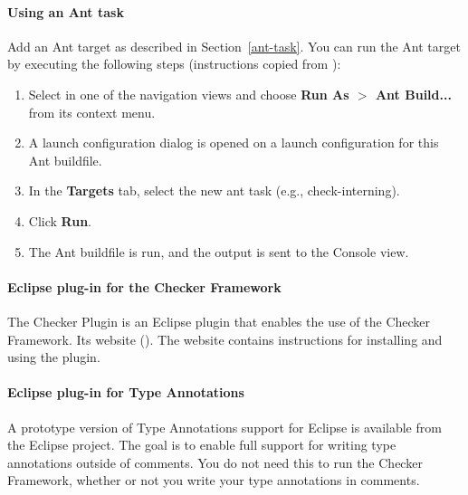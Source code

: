 \paragraph{Using an Ant task}

Add an Ant target as described in Section~\ref{ant-task}.  You can
run the Ant target by executing the following steps
(instructions copied from
):

\begin{enumerate}

\item
  Select  in one of the navigation views and choose
  {\bf Run As $>$ Ant Build...} from its context menu.

\item
  A launch configuration dialog is opened on a launch configuration
  for this Ant buildfile.

\item
  In the {\bf Targets} tab, select the new ant task (e.g., check-interning).

\item
  Click {\bf Run}.

\item
  The Ant buildfile is run, and the output is sent to the Console view.

\end{enumerate}

\paragraph{Eclipse plug-in for the Checker Framework}

The Checker Plugin is an Eclipse plugin that enables the use of the Checker
Framework.
Its website ().
The website contains instructions for installing and using the plugin.

\paragraph{Eclipse plug-in for Type Annotations}

A prototype version of Type Annotations support for Eclipse is
available from the Eclipse project.  The goal is to enable full support for
writing
type annotations outside of comments.  You do not need this to run the
Checker Framework, whether or not you write your type annotations in comments.

